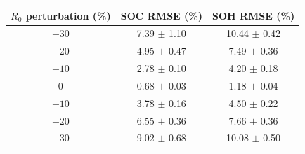 \begin{tabular}{ccc}
\toprule
$R_0$ perturbation (\%) & SOC RMSE (\%) & SOH RMSE (\%) \\
\midrule
$-30$ & 7.39 $\pm$ 1.10 & 10.44 $\pm$ 0.42 \\
$-20$ & 4.95 $\pm$ 0.47 & 7.49 $\pm$ 0.36 \\
$-10$ & 2.78 $\pm$ 0.10 & 4.20 $\pm$ 0.18 \\
0 & 0.68 $\pm$ 0.03 & 1.18 $\pm$ 0.04 \\
$+10$ & 3.78 $\pm$ 0.16 & 4.50 $\pm$ 0.22 \\
$+20$ & 6.55 $\pm$ 0.36 & 7.66 $\pm$ 0.36 \\
$+30$ & 9.02 $\pm$ 0.68 & 10.08 $\pm$ 0.50 \\
\bottomrule
\end{tabular}
